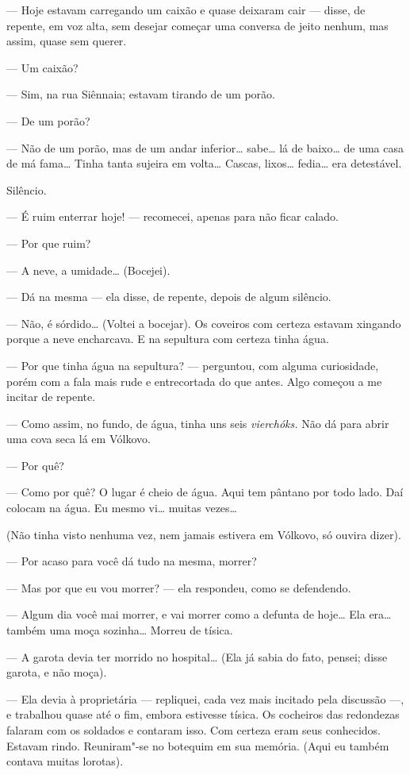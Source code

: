 --- Hoje estavam carregando um caixão e quase deixaram cair --- disse, de
repente, em voz alta, sem desejar começar uma conversa de jeito nenhum,
mas assim, quase sem querer.

--- Um caixão?

--- Sim, na rua Siênnaia; estavam tirando de um porão.

--- De um porão?

--- Não de um porão, mas de um andar inferior\ldots{} sabe\ldots{} lá de baixo\ldots{} de
uma casa de má fama\ldots{} Tinha tanta sujeira em volta\ldots{} Cascas, lixos\ldots{}
fedia\ldots{} era detestável.

Silêncio.

--- É ruim enterrar hoje! --- recomecei, apenas para não ficar calado.

--- Por que ruim?

--- A neve, a umidade\ldots{} (Bocejei).

--- Dá na mesma --- ela disse, de repente, depois de algum silêncio.

--- Não, é sórdido\ldots{} (Voltei a bocejar). Os coveiros com certeza estavam
xingando porque a neve encharcava. E na sepultura com certeza tinha
água.

--- Por que tinha água na sepultura? --- perguntou, com alguma curiosidade,
porém com a fala mais rude e entrecortada do que antes. Algo começou a
me incitar de repente.

--- Como assim, no fundo, de água, tinha uns seis \emph{vierchóks.} Não dá
para abrir uma cova seca lá em Vólkovo.

--- Por quê?

--- Como por quê? O lugar é cheio de água. Aqui tem pântano por todo lado.
Daí colocam na água. Eu mesmo vi\ldots{} muitas vezes\ldots{}

(Não tinha visto nenhuma vez, nem jamais estivera em Vólkovo, só ouvira
dizer).

--- Por acaso para você dá tudo na mesma, morrer?

--- Mas por que eu vou morrer? --- ela respondeu, como se defendendo.

--- Algum dia você mai morrer, e vai morrer como a defunta de hoje\ldots{} Ela
era\ldots{} também uma moça sozinha\ldots{} Morreu de tísica.

--- A garota devia ter morrido no hospital\ldots{} (Ela já sabia do fato,
pensei; disse garota, e não moça).

--- Ela devia à proprietária --- repliquei, cada vez mais incitado pela
discussão ---, e trabalhou quase até o fim, embora estivesse tísica. Os
cocheiros das redondezas falaram com os soldados e contaram isso. Com
certeza eram seus conhecidos. Estavam rindo. Reuniram"-se no botequim em
sua memória. (Aqui eu também contava muitas lorotas).

